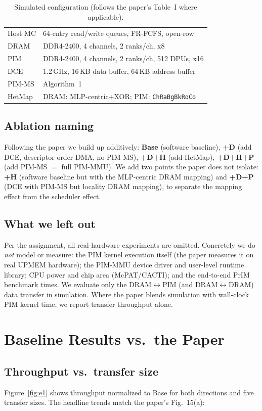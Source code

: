\documentclass[conference]{IEEEtran}
\newcommand{\dpp}{DRAM$\leftrightarrow$PIM}
\begin{document}
\begin{table}[t]
\centering
\caption{Simulated configuration (follows the paper's Table~I where applicable).}
\label{tab:cfg}
\small
\begin{tabular}{@{}ll@{}}
\toprule
Host MC & 64-entry read/write queues, FR-FCFS, open-row \\
DRAM & DDR4-2400, 4 channels, 2 ranks/ch, x8 \\
PIM & DDR4-2400, 4 channels, 2 ranks/ch, 512 DPUs, x16 \\
DCE & 1.2\,GHz, 16\,KB data buffer, 64\,KB address buffer \\
PIM-MS & Algorithm~1 \\
HetMap & DRAM: MLP-centric+XOR; PIM: \texttt{ChRaBgBkRoCo} \\
\bottomrule
\end{tabular}
\end{table}

\subsection{Ablation naming}
Following the paper we build up additively: \textbf{Base} (software baseline),
\textbf{+D} (add DCE, descriptor-order DMA, no PIM-MS), \textbf{+D+H} (add
HetMap), \textbf{+D+H+P} (add PIM-MS $=$ full PIM-MMU). We add two points the
paper does not isolate: \textbf{+H} (software baseline but with the MLP-centric
DRAM mapping) and \textbf{+D+P} (DCE with PIM-MS but locality DRAM mapping), to
separate the mapping effect from the scheduler effect.

\subsection{What we left out}
Per the assignment, all real-hardware experiments are omitted. Concretely we do
\emph{not} model or measure: the PIM kernel execution itself (the paper measures
it on real UPMEM hardware); the PIM-MMU device driver and user-level runtime
library; CPU power and chip area (McPAT/CACTI); and the end-to-end PrIM
benchmark times. We evaluate only the \dpp{} (and DRAM$\leftrightarrow$DRAM) data
transfer in simulation. Where the paper blends simulation with wall-clock PIM
kernel time, we report transfer throughput alone.

\section{Baseline Results vs.\ the Paper}
\subsection{Throughput vs.\ transfer size}
Figure~\ref{fig:e1} shows throughput normalized to Base for both directions and
five transfer sizes. The headline trends match the paper's Fig.~15(a):
\end{document}
